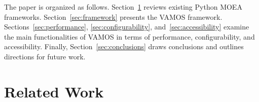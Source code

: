 \documentclass[final,5p,times,twocolumn]{elsarticle}
\begin{document}
The paper is organized as follows. Section~\ref{sec:related} reviews existing Python MOEA frameworks. Section~\ref{sec:framework} presents the VAMOS framework. Sections~\ref{sec:performance}, \ref{sec:configurability}, and~\ref{sec:accessibility} examine the main functionalities of VAMOS in terms of performance, configurability, and accessibility. Finally, Section~\ref{sec:conclusions} draws conclusions and outlines directions for future work.

\section{Related Work} \label{sec:related}
\end{document}
